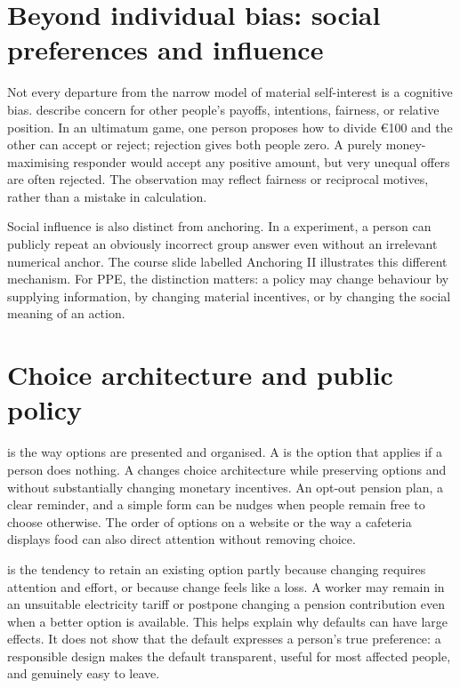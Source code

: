 \section{Beyond individual bias: social preferences and influence}

Not every departure from the narrow model of material self-interest is a
cognitive bias.  describe concern for other
people's payoffs, intentions, fairness, or relative position. In an ultimatum
game, one person proposes how to divide \euro100 and the other can accept or
reject; rejection gives both people zero. A purely money-maximising responder
would accept any positive amount, but very unequal offers are often rejected.
The observation may reflect fairness or reciprocal motives, rather than a
mistake in calculation.

Social influence is also distinct from anchoring. In a 
experiment,
a person can publicly repeat an obviously incorrect group answer even without
an irrelevant numerical anchor. The course slide labelled Anchoring II
illustrates this different mechanism. For PPE, the distinction matters: a
policy may change behaviour by supplying information, by changing material
incentives, or by changing the social meaning of an action.

\section{Choice architecture and public policy}

 is the way options are presented and organised.
A  is the option that applies if a person does nothing. A
 changes choice architecture while preserving options and
without substantially changing monetary incentives. An opt-out pension plan,
a clear reminder, and a simple form can be nudges when people remain free to
choose otherwise. The order of options on a website or the way a cafeteria
displays food can also direct attention without removing choice.

 is the tendency to retain an existing option partly
because changing requires attention and effort, or because change feels like a
loss. A worker may remain in an unsuitable electricity tariff or postpone
changing a pension contribution even when a better option is available. This
helps explain why defaults can have large effects. It does not show that the
default expresses a person's true preference: a responsible design makes the
default transparent, useful for most affected people, and genuinely easy to
leave.

